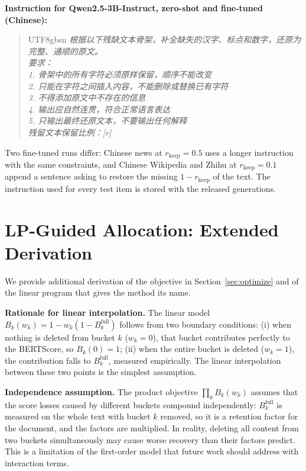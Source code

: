 \documentclass[11pt]{article}
\newcommand{\rkeep}{r_{\mathrm{keep}}}
\begin{document}
\textbf{Instruction for Qwen2.5-3B-Instruct, zero-shot and fine-tuned (Chinese):}
\begin{quote}
\begin{CJK*}{UTF8}{gbsn}
\textit{根据以下残缺文本骨架，补全缺失的汉字、标点和数字，还原为完整、通顺的原文。}\\
\textit{要求：}\\
\textit{1. 骨架中的所有字符必须原样保留，顺序不能改变}\\
\textit{2. 只能在字符之间插入内容，不能删除或替换已有字符}\\
\textit{3. 不得添加原文中不存在的信息}\\
\textit{4. 输出应自然连贯，符合正常语言表达}\\
\textit{5. 只输出最终还原文本，不要输出任何解释}\\
\textit{残留文本保留比例：\textup{[r]}}
\end{CJK*}
\end{quote}
\noindent Two fine-tuned runs differ: Chinese news at $\rkeep = 0.5$ uses a longer instruction with the same
constraints, and Chinese Wikipedia and Zhihu at $\rkeep = 0.1$ append a sentence asking to restore the missing
$1 - \rkeep$ of the text. The instruction used for every test item is stored with the released generations.

\section{LP-Guided Allocation: Extended Derivation}
\label{app:lp_derivation}

We provide additional derivation of the objective in Section~\ref{sec:optimize} and of the linear program
that gives the method its name.

\textbf{Rationale for linear interpolation.}
The linear model $B_k(w_k) = 1 - w_k(1 - B_k^{\mathrm{full}})$
follows from two boundary conditions: (i) when nothing
is deleted from bucket $k$ ($w_k = 0$), that bucket
contributes perfectly to the BERTScore, so $B_k(0) = 1$;
(ii) when the entire bucket is deleted ($w_k = 1$), the
contribution falls to $B_k^{\mathrm{full}}$, measured empirically.
The linear interpolation between these two points is the
simplest assumption.

\textbf{Independence assumption.}
The product objective $\prod_k B_k(w_k)$ assumes that the
score losses caused by different buckets compound
independently: $B_k^{\mathrm{full}}$ is measured on the whole
text with bucket $k$ removed, so it is a retention factor for
the document, and the factors are multiplied.  In reality,
deleting all content from two buckets simultaneously may
cause worse recovery than their factors predict.  This is a
limitation of the first-order model that future work should
address with interaction terms.
\end{document}
